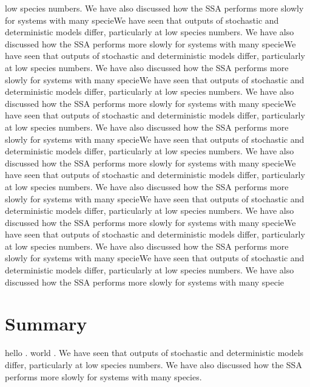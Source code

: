 \documentclass[11pt]{article}
\begin{document}
\begin{multicols}{2}
low species numbers. We have also discussed how the SSA performs more slowly for systems with many specieWe have seen that outputs of stochastic and deterministic models differ, particularly at low species numbers. We have also discussed how the SSA performs more slowly for systems with many specieWe have seen that outputs of stochastic and deterministic models differ, particularly at low species numbers. We have also discussed how the SSA performs more slowly for systems with many specieWe have seen that outputs of stochastic and deterministic models differ, particularly at low species numbers. We have also discussed how the SSA performs more slowly for systems with many specieWe have seen that outputs of stochastic and deterministic models differ, particularly at low species numbers. We have also discussed how the SSA performs more slowly for systems with many specieWe have seen that outputs of stochastic and deterministic models differ, particularly at low species numbers. We have also discussed how the SSA performs more slowly for systems with many specieWe have seen that outputs of stochastic and deterministic models differ, particularly at low species numbers. We have also discussed how the SSA performs more slowly for systems with many specieWe have seen that outputs of stochastic and deterministic models differ, particularly at low species numbers. We have also discussed how the SSA performs more slowly for systems with many specieWe have seen that outputs of stochastic and deterministic models differ, particularly at low species numbers. We have also discussed how the SSA performs more slowly for systems with many specieWe have seen that outputs of stochastic and deterministic models differ, particularly at low species numbers. We have also discussed how the SSA performs more slowly for systems with many specie
\section{Summary}
hello \citep{Lawless2010}.
world \citet{Aamport:1986a}.
We have seen that outputs of stochastic and deterministic models differ, particularly at low species numbers. We have also discussed how the SSA performs more slowly for systems with many species.

\end{multicols}


%
%

\end{document}
